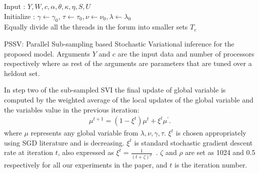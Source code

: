 \documentclass{sig-alternate}
\begin{document}
\begin{algorithm}[t]
\small
\SetAlgoLined
Input : $Y,W,c,\alpha,\theta,\kappa,\eta, S, U$\\
Initialize : $\gamma\leftarrow \gamma_0$,
$\tau\leftarrow \tau_0, \nu\leftarrow \nu_0, \lambda\leftarrow \lambda_0$\\
Equally divide all the threads in the forum into smaller sets $T_c$\\ 
\label{algo:stochasticAlgo}
\caption{{\small PSSV: Parallel Sub-sampling based Stochastic Variational inference for
the proposed model. Arguments $Y$ and $c$ are the input data and number of processors
respectively where as rest of the 
arguments are parameters that are tuned over a heldout set.}}
\end{algorithm}



In step two of the sub-sampled SVI the final update of global variable is
computed by the weighted average of the local updates of the global variable and
the variables value in the previous iteration:
\begin{align}
\mu^{t+1} = (1-\xi^t)\mu^{t} + \xi^t\mu^{'}. 
\label{eqn:globalUpStoc}
\end{align} 
\normalsize
where $\mu$ represents any global variable from $\lambda, \nu, \gamma, \tau$.
 $\xi^t$ is chosen appropriately using SGD literature and is
decreasing.  $\xi^t$ is standard stochastic
gradient descent rate at iteration $t$, also expressed as $\xi^t =
\frac{1}{(t+\zeta)^{\rho}}$~\cite{conf/nips/GopalanMGFB12}. $\zeta$ and
$\rho$ are set as 1024 and 0.5 respectively for all our experiments in the
paper, and $t$ is the iteration number. 
\end{document}
